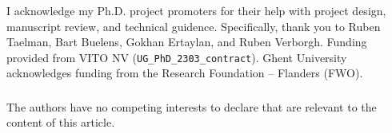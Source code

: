 \documentclass[runningheads]{llncs}
\begin{document}
\begin{credits}
\subsubsection{\ackname} 
I acknowledge my Ph.D. project promoters for their help with project design, manuscript review, and technical guidence.
Specifically, thank you to Ruben Taelman, Bart Buelens, Gokhan Ertaylan, and Ruben Verborgh.
Funding provided from VITO NV (\verb|UG_PhD_2303_contract|). 
Ghent University acknowledges funding from the Research Foundation – Flanders (FWO).
\subsubsection{\discintname} The authors have no competing interests to declare that are relevant to the content of this article.
\end{credits}



\end{document}
